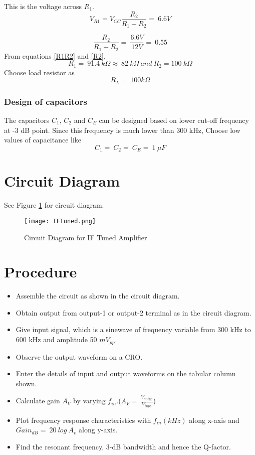 \noindent This is the voltage across $R_1$. 
\begin{equation}
V_{R1}= V_{CC} \frac{R_2}{R_1+R_2}=\ 6.6V
\end{equation}

\begin{equation}
\label{R2}
\frac{R_2}{R_1+R_2}=\ \frac{6.6V}{12V}=\ 0.55
\end{equation}
From equations \ref{R1R2} and \ref{R2}, 
\begin{equation}
R_1=\ 91.4\ k\Omega \approx \ 82\ k\Omega \ and \ R_2=100\ k\Omega
\end{equation}
\noindent Choose load resistor as 
\begin{equation}
R_L=\ 100 k\Omega
\end{equation}
\subsubsection{Design of capacitors}
\noindent The capacitors $C_1$, $C_2$  and $C_E$  can be designed based on lower cut-off frequency at -3 dB point. Since this frequency is much lower than 300 kHz, Choose low values of capacitance like \begin{equation}
C_1=\ C_2=\ C_E=\ 1 \ \mu F
\end{equation}

\section*{Circuit Diagram}
See Figure \ref{IFTuned} for circuit diagram.
\begin{figure}[ht]
\texttt{[image: IFTuned.png]}
\caption{Circuit Diagram for IF Tuned Amplifier}
\label{IFTuned}
\end{figure}
\section*{Procedure}
\begin{itemize}
\item
Assemble the circuit as shown in the circuit diagram.
\item
Obtain output from output-1 or output-2 terminal as in the circuit diagram.
\item
Give input signal, which is a sinewave of frequency variable from 300 kHz to 600 kHz and amplitude 50 $mV_{pp}$.
\item
Observe the output waveform on a CRO. 
\item
Enter the details of input and output waveforms on the tabular column shown.
\item
Calculate gain $A_V$ by varying $f_{in}$.($A_V= \ \frac{V_{outpp}}{V_{inpp}}$)

\item
Plot frequency response characteristics with $f_{in} (kHz) $ along x-axis and  $Gain_{dB}=\ 20\ log\ A_v$ along y-axis.
\item
Find the resonant frequency, 3-dB bandwidth and hence the Q-factor.
\end{itemize}
